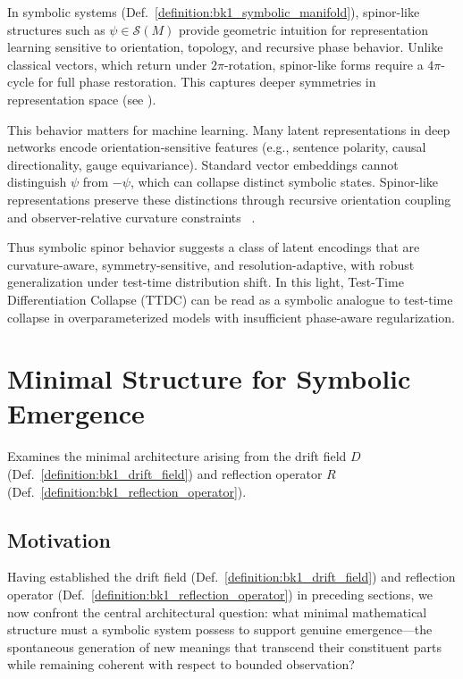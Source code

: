 \begin{scholium}
\label{scholium:bk1_spinor_like_ml}
In symbolic systems (Def.~\ref{definition:bk1_symbolic_manifold}), spinor-like
structures such as \( \psi \in \mathcal{S}(M) \) provide geometric intuition
for representation learning sensitive to orientation, topology, and recursive
phase behavior.
Unlike classical vectors, which return under \(2\pi\)-rotation, spinor-like
forms require a \(4\pi\)-cycle for full phase restoration.
This captures deeper symmetries in representation space
(see \cite{lawson_spin_geometry,penrose_spinors}).

This behavior matters for machine learning.
Many latent representations in deep networks encode orientation-sensitive
features (e.g., sentence polarity, causal directionality, gauge equivariance).
Standard vector embeddings cannot distinguish $\psi$ from $-\psi$, which can
collapse distinct symbolic states.
Spinor-like representations preserve these distinctions through recursive
orientation coupling and observer-relative curvature constraints
~\cite{friedrich_dirac,nash_sen}.

Thus symbolic spinor behavior suggests a class of latent encodings that are
curvature-aware, symmetry-sensitive, and resolution-adaptive, with robust
generalization under test-time distribution shift.
In this light, Test-Time Differentiation Collapse (TTDC) can be read as a
symbolic analogue to test-time collapse in overparameterized models with
insufficient phase-aware regularization.
\end{scholium}

\section{Minimal Structure for Symbolic Emergence}
\label{sec:bk1_minimal_structure_for_symbolic_emergence}
Examines the minimal architecture arising from the drift field $D$ (Def.~\ref{definition:bk1_drift_field}) and reflection operator $R$ (Def.~\ref{definition:bk1_reflection_operator}).
\subsection{Motivation}
\label{subsec:bk1_motivation}

Having established the drift field (Def.~\ref{definition:bk1_drift_field}) and reflection operator (Def.~\ref{definition:bk1_reflection_operator}) in preceding sections, we now confront the central architectural question: what minimal mathematical structure must a symbolic system possess to support genuine emergence—the spontaneous generation of new meanings that transcend their constituent parts while remaining coherent with respect to bounded observation?

